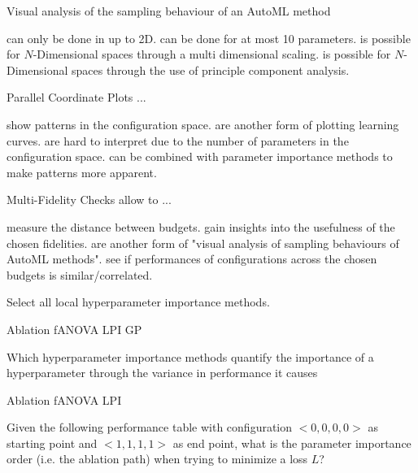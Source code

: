 \documentclass{exam}
\begin{document}
\begin{questions}
\question Visual analysis of the sampling behaviour of an AutoML method 
\begin{choices}
    \choice can only be done in up to 2D.
    \choice can be done for at most 10 parameters.
    \choice is possible for $N$-Dimensional spaces through a multi dimensional scaling. %
    \choice is possible for $N$-Dimensional spaces through the use of principle component analysis.
\end{choices}

\question Parallel Coordinate Plots ...
\begin{choices}
    \choice show patterns in the configuration space. %
    \choice are another form of plotting learning curves.
    \choice are hard to interpret due to the number of parameters in the configuration space. %
    \choice can be combined with parameter importance methods to make patterns more apparent. %
\end{choices}

\question Multi-Fidelity Checks allow to ...
\begin{choices}
    \choice measure the distance between budgets.
    \choice gain insights into the usefulness of the chosen fidelities. %
    \choice are another form of "visual analysis of sampling behaviours of AutoML methods".
    \choice see if performances of configurations across the chosen budgets is similar/correlated. %
\end{choices}

\question Select all local hyperparameter importance methods.
\begin{choices}
    \choice Ablation %
    \choice fANOVA
    \choice LPI %
    \choice GP
\end{choices}

\question Which hyperparameter importance methods quantify the importance of a hyperparameter through the variance in performance it causes
\begin{choices}
    \choice Ablation
    \choice fANOVA %
    \choice LPI %
\end{choices}

\question Given the following performance table with configuration $<0,0,0,0>$ as starting point and $<1,1,1,1>$ as end point, what is the parameter importance order (i.e. the ablation path) when trying to minimize a loss $L$?


\end{questions}
\end{document}
